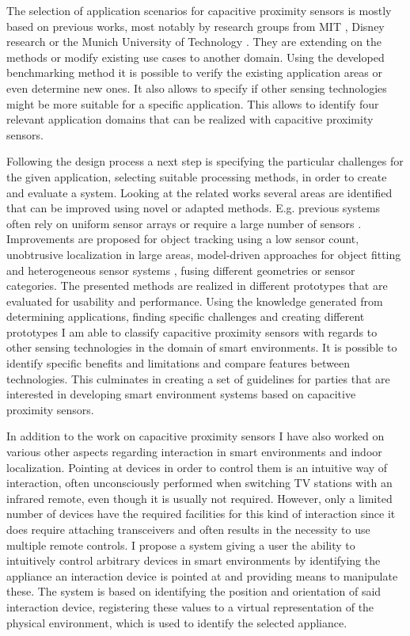 The selection of application scenarios for capacitive proximity sensors is mostly based on previous works, most notably by research groups from MIT \cite{Paradiso2002}, Disney research \cite{Sato2012} or the Munich University of Technology \cite{Wimmer2006}. They are extending on the methods or modify existing use cases to another domain. Using the developed benchmarking method it is possible to verify the existing application areas or even determine new ones. It also allows to specify if other sensing technologies might be more suitable for a specific application. This allows to identify four relevant application domains that can be realized with capacitive proximity sensors. 

Following the design process a next step is specifying the particular challenges for the given application, selecting suitable processing methods, in order to create and evaluate a system. Looking at the related works several areas are identified that can be improved using novel or adapted methods. E.g. previous systems often rely on uniform sensor arrays \cite{Smith1996a} or require a large number of sensors \cite{rekimoto2002smartskin}. Improvements are proposed for object tracking using a low sensor count, unobtrusive localization in large areas, model-driven approaches for object fitting and heterogeneous sensor systems , fusing different geometries or sensor categories. The presented methods are realized in different prototypes that are evaluated for usability and performance.
Using the knowledge generated from determining applications, finding specific challenges and creating different prototypes I am able to classify capacitive proximity sensors with regards to other sensing technologies in the domain of smart environments. It is possible to identify specific benefits and limitations and compare features between technologies. This culminates in creating a set of guidelines for parties that are interested in developing smart environment systems based on capacitive proximity sensors.

In addition to the work on capacitive proximity sensors I have also worked on various other aspects regarding interaction in smart environments and indoor localization.  Pointing at devices in order to control them is an intuitive way of interaction, often unconsciously performed when switching TV stations with an infrared remote, even though it is usually not required. However, only a limited number of devices have the required facilities for this kind of interaction since it does require attaching transceivers and often results in the necessity to use multiple remote controls. I propose a system giving a user the ability to intuitively control arbitrary devices in smart environments by identifying the appliance an interaction device is pointed at and providing means to manipulate these. The system is based on identifying the position and orientation of said interaction device, registering these values to a virtual representation of the physical environment, which is used to identify the selected appliance. 

